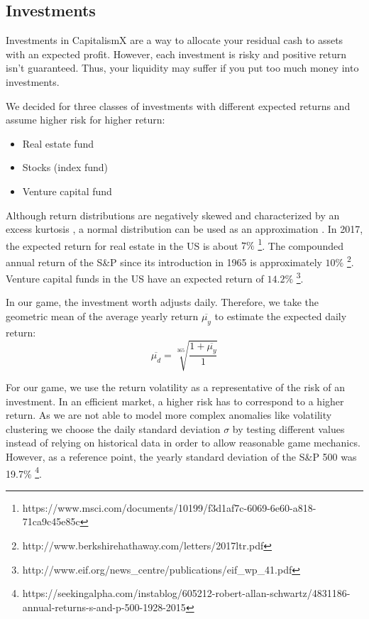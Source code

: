 \subsection{Investments}
\label{sec:investments_simulation}

 Investments in CapitalismX are a way to allocate your residual cash to assets with an expected profit. However, each investment is risky and positive return isn't guaranteed. Thus, your liquidity may suffer if you put too much money into investments.
  
  We decided for three classes of investments with different expected returns and assume higher risk for higher return:
\begin{itemize}
	\item Real estate fund
	\item Stocks (index fund)
	\item Venture capital fund
\end{itemize}

Although return distributions are negatively skewed and characterized by an excess kurtosis \cite{ANDERSEN200143}, a normal distribution can be used as an approximation \cite{doi:10.1080/01621459.1972.10481297}. In 2017, the expected return for real estate in the US is about $7\%$ \footnote{https://www.msci.com/documents/10199/f3d1af7c-6069-6e60-a818-71ca9c45e85c}. The compounded annual return of the S\&P since its introduction in 1965 is approximately $10\%$ \footnote{http://www.berkshirehathaway.com/letters/2017ltr.pdf}. Venture capital funds in the US have an expected return of $14.2\%$ \footnote{http://www.eif.org/news\_centre/publications/eif\_wp\_41.pdf}.

In our game, the investment worth adjusts daily. Therefore, we take the geometric mean of the average yearly return $\overline{\mu_y}$ to estimate the expected daily return:
\begin{equation}
	\overline{\mu_d} = \sqrt[365]{\frac{1 + \overline{\mu_y}}{1}}
\end{equation}

For our game, we use the return volatility as a representative of the risk of an investment. In an efficient market, a higher risk has to correspond to a higher return. As we are not able to model more complex anomalies like volatility clustering we choose the daily standard deviation $\sigma$ by testing different values instead of relying on historical data in order to allow reasonable game mechanics. However, as a reference point, the yearly standard deviation of the S\&P 500 was 19.7\% \footnote{https://seekingalpha.com/instablog/605212-robert-allan-schwartz/4831186-annual-returns-s-and-p-500-1928-2015}. 

